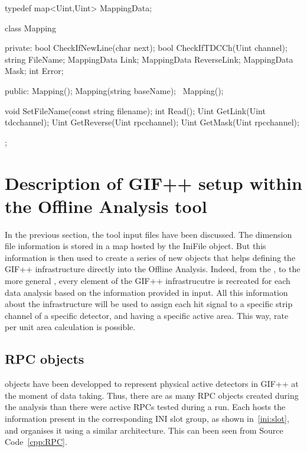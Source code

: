 	\begin{code}
	\begin{cppcode}
typedef map<Uint,Uint> MappingData;

class Mapping {
    private:
        bool        CheckIfNewLine(char next);
        bool        CheckIfTDCCh(Uint channel);
        string      FileName;
        MappingData Link;
        MappingData ReverseLink;
        MappingData Mask;
        int         Error;

    public:
        Mapping();
        Mapping(string baseName);
        ~Mapping();

        void SetFileName(const string filename);
        int Read();
        Uint GetLink(Uint tdcchannel);
        Uint GetReverse(Uint rpcchannel);
        Uint GetMask(Uint rpcchannel);
};
	\end{cppcode}
	\label{cpp:mapping}
	\vspace{5mm}
	\end{code}
	
\section{Description of GIF++ setup within the Offline Analysis tool}
\label{app2:sec:GIFsetup}

	In the previous section, the tool input files have been discussed. The dimension file information is stored in a map hosted by the IniFile object. But this information is then used to create a series of new objects that helps defining the GIF++ infrastructure directly into the Offline Analysis. Indeed, from the , to the more general , every element of the GIF++ infrastrucutre is recreated for each data analysis based on the information provided in input. All this information about the infrastructure will be used to assign each hit signal to a specific strip channel of a specific detector, and having a specific active area. This way, rate per unit area calculation is possible.\\
	
	\subsection{RPC objects}
	\label{app2:ssec:RPC}
	
	 objects have been developped to represent physical active detectors in GIF++ at the moment of data taking. Thus, there are as many RPC objects created during the analysis than there were active RPCs tested during a run. Each  hosts the information present in the corresponding INI slot group, as shown in~\ref{ini:slot}, and organises it using a similar architecture. This can been seen from Source Code~\ref{cpp:RPC}.
	
